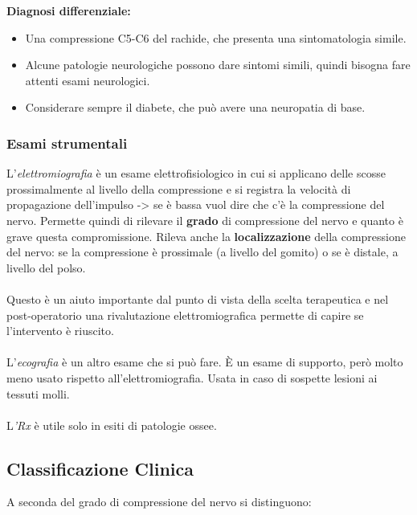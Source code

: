 \textbf{Diagnosi differenziale:}

\begin{itemize}
\item
  Una compressione C5-C6 del rachide, che presenta una sintomatologia simile.
\item
  Alcune patologie neurologiche possono dare sintomi simili, quindi bisogna fare attenti esami neurologici.
\item
  Considerare sempre il diabete, che può avere una neuropatia di base.
\end{itemize}

\subsubsection{Esami strumentali}

L'\emph{elettromiografia} è un esame elettrofisiologico in cui si applicano delle scosse prossimalmente al livello della compressione e si registra la velocità di propagazione dell'impulso -> se è bassa vuol dire che c'è la compressione del nervo.
Permette quindi di rilevare il \textbf{grado} di compressione del nervo e quanto è grave questa compromissione. Rileva anche la \textbf{localizzazione} della compressione del nervo: se la compressione è prossimale (a livello del gomito) o se è distale, a livello del polso.
\\\\
Questo è un aiuto importante dal punto di vista della scelta terapeutica e nel post-operatorio una rivalutazione elettromiografica permette di capire se l'intervento è riuscito.
\\\\
L'\emph{ecografia} è un altro esame che si può fare. È un esame di supporto, però molto meno usato rispetto all'elettromiografia. Usata in caso di sospette lesioni ai tessuti molli.
\\\\
L\emph{'Rx} è utile solo in esiti di patologie ossee.


\subsection{Classificazione Clinica}

A seconda del grado di compressione del nervo si distinguono:


